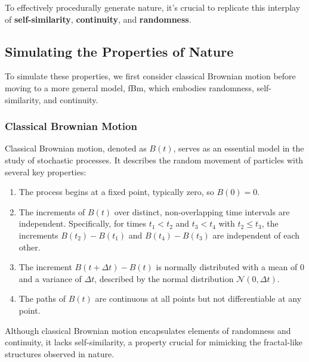To effectively procedurally generate nature, it's crucial to replicate this interplay of \textbf{self-similarity}, \textbf{continuity}, and \textbf{randomness}.

\subsection{Simulating the Properties of Nature}

To simulate these properties, we first consider classical Brownian motion before moving to a more general model, fBm, which embodies randomness, self-similarity, and continuity.

\subsubsection{Classical Brownian Motion}

 

Classical Brownian motion, denoted as $B(t)$, serves as an essential model in the study of stochastic processes. It describes the random movement of particles with several key properties:

\begin{enumerate}
    \item The process begins at a fixed point, typically zero, so $B(0) = 0$.
    \item  The increments of $B(t)$ over distinct, non-overlapping time intervals are independent. Specifically, for times $t_1 < t_2$ and $t_3 < t_4$ with $t_2 \leq t_3$, the increments $B(t_2) - B(t_1)$ and $B(t_4) - B(t_3)$ are independent of each other.
    \item The increment $B(t + \Delta t) - B(t)$ is normally distributed with a mean of 0 and a variance of $\Delta t$, described by the normal distribution $\mathcal{N}(0, \Delta t)$.
    \item The paths of $B(t)$ are continuous at all points but not differentiable at any point.
\end{enumerate}

Although classical Brownian motion encapsulates elements of randomness and continuity, it lacks self-similarity, a property crucial for mimicking the fractal-like structures observed in nature. 

